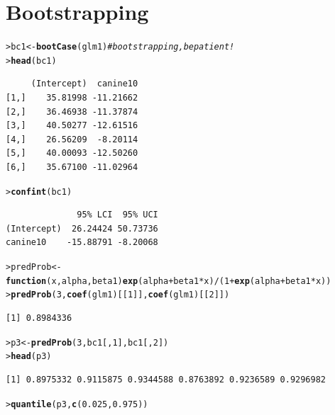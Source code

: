 \documentclass{article}\usepackage[]{graphicx}\usepackage[]{color}
\makeatletter
\newcommand{\hlnum}[1]{\textcolor[rgb]{0.686,0.059,0.569}{#1}}%
\newcommand{\hlcom}[1]{\textcolor[rgb]{0.678,0.584,0.686}{\textit{#1}}}%
\newcommand{\hlopt}[1]{\textcolor[rgb]{0,0,0}{#1}}%
\newcommand{\hlstd}[1]{\textcolor[rgb]{0.345,0.345,0.345}{#1}}%
\newcommand{\hlkwa}[1]{\textcolor[rgb]{0.161,0.373,0.58}{\textbf{#1}}}%
\newcommand{\hlkwb}[1]{\textcolor[rgb]{0.69,0.353,0.396}{#1}}%
\newcommand{\hlkwc}[1]{\textcolor[rgb]{0.333,0.667,0.333}{#1}}%
\newcommand{\hlkwd}[1]{\textcolor[rgb]{0.737,0.353,0.396}{\textbf{#1}}}%
\newenvironment{kframe}{%
 \def\at@end@of@kframe{}%
 \ifinner\ifhmode%
  \def\at@end@of@kframe{\end{minipage}}%
  \begin{minipage}{\columnwidth}%
 \fi\fi%
 \def\FrameCommand##1{\hskip\@totalleftmargin \hskip-\fboxsep
 \colorbox{shadecolor}{##1}\hskip-\fboxsep
     \hskip-\linewidth \hskip-\@totalleftmargin \hskip\columnwidth}%
 \MakeFramed {\advance\hsize-\width
   \@totalleftmargin\z@ \linewidth\hsize
   \@setminipage}}%
 {\par\unskip\endMakeFramed%
 \at@end@of@kframe}
\newenvironment{knitrout}{}{} %
\makeatother
\begin{document}
\section{Bootstrapping}
\begin{knitrout}
\color{fgcolor}\begin{kframe}
\begin{alltt}
\hlstd{> }\hlstd{bc1} \hlkwb{<-} \hlkwd{bootCase}\hlstd{(glm1)}      \hlcom{# bootstrapping, be patient!}
\hlstd{> }\hlkwd{head}\hlstd{(bc1)}
\end{alltt}
\begin{verbatim}
     (Intercept)  canine10
[1,]    35.81998 -11.21662
[2,]    36.46938 -11.37874
[3,]    40.50277 -12.61516
[4,]    26.56209  -8.20114
[5,]    40.00093 -12.50260
[6,]    35.67100 -11.02964
\end{verbatim}
\begin{alltt}
\hlstd{> }\hlkwd{confint}\hlstd{(bc1)}
\end{alltt}
\begin{verbatim}
              95% LCI  95% UCI
(Intercept)  26.24424 50.73736
canine10    -15.88791 -8.20068
\end{verbatim}
\begin{alltt}
\hlstd{> }\hlstd{predProb} \hlkwb{<-} \hlkwa{function}\hlstd{(}\hlkwc{x}\hlstd{,}\hlkwc{alpha}\hlstd{,}\hlkwc{beta1}\hlstd{)} \hlkwd{exp}\hlstd{(alpha}\hlopt{+}\hlstd{beta1}\hlopt{*}\hlstd{x)}\hlopt{/}\hlstd{(}\hlnum{1}\hlopt{+}\hlkwd{exp}\hlstd{(alpha}\hlopt{+}\hlstd{beta1}\hlopt{*}\hlstd{x))}
\hlstd{> }\hlkwd{predProb}\hlstd{(}\hlnum{3}\hlstd{,}\hlkwd{coef}\hlstd{(glm1)[[}\hlnum{1}\hlstd{]],}\hlkwd{coef}\hlstd{(glm1)[[}\hlnum{2}\hlstd{]])}
\end{alltt}
\begin{verbatim}
[1] 0.8984336
\end{verbatim}
\begin{alltt}
\hlstd{> }\hlstd{p3} \hlkwb{<-} \hlkwd{predProb}\hlstd{(}\hlnum{3}\hlstd{,bc1[,}\hlnum{1}\hlstd{],bc1[,}\hlnum{2}\hlstd{])}
\hlstd{> }\hlkwd{head}\hlstd{(p3)}
\end{alltt}
\begin{verbatim}
[1] 0.8975332 0.9115875 0.9344588 0.8763892 0.9236589 0.9296982
\end{verbatim}
\begin{alltt}
\hlstd{> }\hlkwd{quantile}\hlstd{(p3,}\hlkwd{c}\hlstd{(}\hlnum{0.025}\hlstd{,}\hlnum{0.975}\hlstd{))}
\end{alltt}
\begin{verbatim}

\end{verbatim}
\end{kframe}
\end{knitrout}
\end{document}
